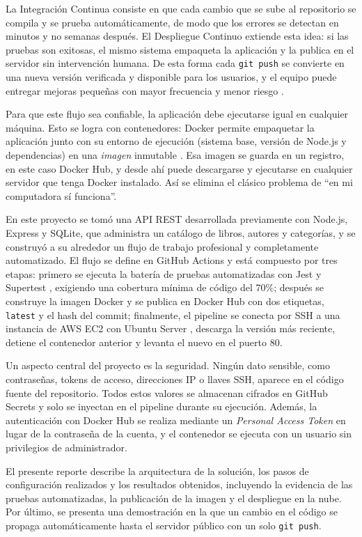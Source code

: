 \documentclass[12pt,letterpaper]{article}
\begin{document}
La Integración Continua consiste en que cada cambio que se sube al repositorio se compila y se prueba automáticamente, de modo que los errores se detectan en minutos y no semanas después. El Despliegue Continuo extiende esta idea: si las pruebas son exitosas, el mismo sistema empaqueta la aplicación y la publica en el servidor sin intervención humana. De esta forma cada \texttt{git push} se convierte en una nueva versión verificada y disponible para los usuarios, y el equipo puede entregar mejoras pequeñas con mayor frecuencia y menor riesgo \cite{humble2010}.

Para que este flujo sea confiable, la aplicación debe ejecutarse igual en cualquier máquina. Esto se logra con contenedores: Docker permite empaquetar la aplicación junto con su entorno de ejecución (sistema base, versión de Node.js y dependencias) en una \textit{imagen} inmutable \cite{dockerdocs}. Esa imagen se guarda en un registro, en este caso Docker Hub, y desde ahí puede descargarse y ejecutarse en cualquier servidor que tenga Docker instalado. Así se elimina el clásico problema de ``en mi computadora sí funciona''.

En este proyecto se tomó una API REST desarrollada previamente con Node.js, Express y SQLite, que administra un catálogo de libros, autores y categorías, y se construyó a su alrededor un flujo de trabajo profesional y completamente automatizado. El flujo se define en GitHub Actions \cite{githubactions} y está compuesto por tres etapas: primero se ejecuta la batería de pruebas automatizadas con Jest y Supertest \cite{jest}, exigiendo una cobertura mínima de código del 70\%; después se construye la imagen Docker y se publica en Docker Hub con dos etiquetas, \texttt{latest} y el hash del commit; finalmente, el pipeline se conecta por SSH a una instancia de AWS EC2 con Ubuntu Server \cite{awsec2}, descarga la versión más reciente, detiene el contenedor anterior y levanta el nuevo en el puerto 80.

Un aspecto central del proyecto es la seguridad. Ningún dato sensible, como contraseñas, tokens de acceso, direcciones IP o llaves SSH, aparece en el código fuente del repositorio. Todos estos valores se almacenan cifrados en GitHub Secrets y solo se inyectan en el pipeline durante su ejecución. Además, la autenticación con Docker Hub se realiza mediante un \textit{Personal Access Token} en lugar de la contraseña de la cuenta, y el contenedor se ejecuta con un usuario sin privilegios de administrador.

El presente reporte describe la arquitectura de la solución, los pasos de configuración realizados y los resultados obtenidos, incluyendo la evidencia de las pruebas automatizadas, la publicación de la imagen y el despliegue en la nube. Por último, se presenta una demostración en la que un cambio en el código se propaga automáticamente hasta el servidor público con un solo \texttt{git push}.
\end{document}
